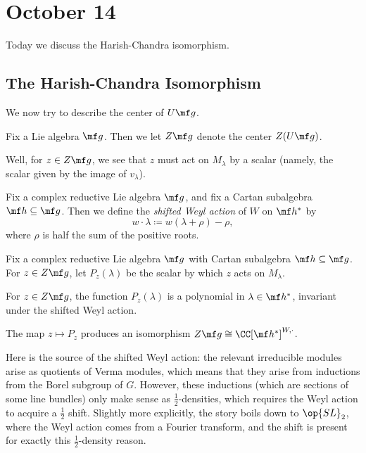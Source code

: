 \documentclass[../notes.tex]{subfiles}
\begin{document}
\section{October 14}
Today we discuss the Harish-Chandra isomorphism.

\subsection{The Harish-Chandra Isomorphism}
We now try to describe the center of $U\mf g$.
\begin{notation}
	Fix a Lie algebra $\mf g$. Then we let $Z\mf g$ denote the center $Z(U\mf g)$.
\end{notation}
Well, for $z\in Z\mf g$, we see that $z$ must act on $M_\lambda$ by a scalar (namely, the scalar given by the image of $v_\lambda$).
\begin{definition}
	Fix a complex reductive Lie algebra $\mf g$, and fix a Cartan subalgebra $\mf h\subseteq\mf g$. Then we define the \textit{shifted Weyl action} of $W$ on $\mf h^*$ by
	\[w\cdot\lambda\coloneqq w(\lambda+\rho)-\rho,\]
	where $\rho$ is half the sum of the positive roots.
\end{definition}
\begin{theorem} \label{thm:hc-iso}
	Fix a complex reductive Lie algebra $\mf g$ with Cartan subalgebra $\mf h\subseteq\mf g$. For $z\in Z\mf g$, let $P_z(\lambda)$ be the scalar by which $z$ acts on $M_\lambda$.
	\begin{listalph}
		\item For $z\in Z\mf g$, the function $P_z(\lambda)$ is a polynomial in $\lambda\in\mf h^*$, invariant under the shifted Weyl action.
		\item The map $z\mapsto P_z$ produces an isomorphism $Z\mf g\cong\CC[\mf h^*]^{W,\cdot}$.
	\end{listalph}
\end{theorem}
\begin{remark}
	Here is the source of the shifted Weyl action: the relevant irreducible modules arise as quotients of Verma modules, which means that they arise from inductions from the Borel subgroup of $G$. However, these inductions (which are sections of some line bundles) only make sense as $\frac12$-densities, which requires the Weyl action to acquire a $\frac12$ shift. Slightly more explicitly, the story boils down to $\op{SL}_2$, where the Weyl action comes from a Fourier transform, and the shift is present for exactly this $\frac12$-density reason.
\end{remark}
\end{document}
